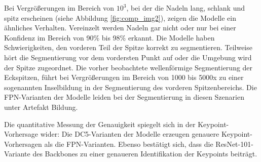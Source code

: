 Bei Vergrößerungen im Bereich von $10^3$, bei der die Nadeln lang, schlank und spitz erscheinen (siehe Abbildung \ref{fig:comp_img2}), zeigen die Modelle ein ähnliches Verhalten. Vereinzelt werden Nadeln gar nicht oder nur bei einer Konfidenz im Bereich von 90\% bis 98\% erkannt. Die Modelle haben Schwierigkeiten, den vorderen Teil der Spitze korrekt zu segmentieren. Teilweise hört die Segmentierung vor dem vordersten Punkt auf oder die Umgebung wird der Spitze zugeordnet.
Die vorher beobachtete wellenförmige Segmentierung der Eckspitzen, führt bei Vergrößerungen im Bereich von 1000 bis 5000x zu einer sogenannten \glqq Inselbildung\grqq{} in der Segmentierung des vorderen Spitzenbereichs.
Die FPN-Varianten der Modelle leiden bei der Segmentierung in diesen Szenarien unter Artefakt Bildung.

Die quantitative Messung der Genauigkeit spiegelt sich in der Keypoint-Vorhersage wider: Die DC5-Varianten der Modelle erzeugen genauere Keypoint-Vorhersagen als die FPN-Varianten. Ebenso bestätigt sich, dass die ResNet-101-Variante des Backbones zu einer genaueren Identifikation der Keypoints beiträgt.
\newpage
